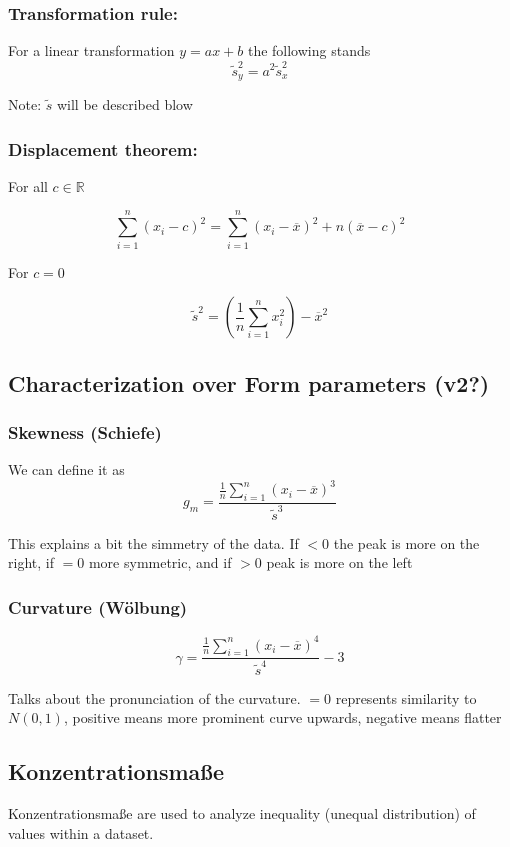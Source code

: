 \documentclass{article}
\begin{document}
\subsubsection{Transformation rule: } For a linear transformation $y = ax + b$ the following stands
\[\tilde{s}^2_y = a^2\tilde{s}^2_x\]

Note: $\tilde{s}$ will be described blow

\subsubsection{Displacement theorem: } For all $c \in \mathbb{R}$

\[\sum_{i=1}^n(x_i-c)^2 = \sum_{i=1}^n(x_i-\overline{x})^2 + n(\overline{x}-c)^2 \]

For $c = 0$

\[\tilde{s}^2  = \left(\frac{1}{n} \sum_{i=1}^n x_i^2\right) - \overline{x}^2\]


\subsection{Characterization over Form parameters (v2?)}
\subsubsection{Skewness (Schiefe)}

We can define it as 
\[g_m = \frac{\frac{1}{n} \sum_{i=1}^n(x_i - \overline{x})^3}{\tilde{s}^3}\]

This explains a bit the simmetry of the data. If $<0$ the peak is more on the right, if $=0$ more symmetric, and if $>0$ peak is more on the left

\subsubsection{Curvature (Wölbung)}

\[\gamma = \frac{\frac{1}{n} \sum_{i=1}^n(x_i - \overline{x})^4}{\tilde{s}^4} - 3\]

Talks about the pronunciation of the curvature. $=0$ represents similarity to $N(0,1)$, positive means more prominent curve upwards, negative means flatter

\subsection{Konzentrationsmaße}
Konzentrationsmaße are used to analyze inequality (unequal distribution) of values within a dataset.
\end{document}
